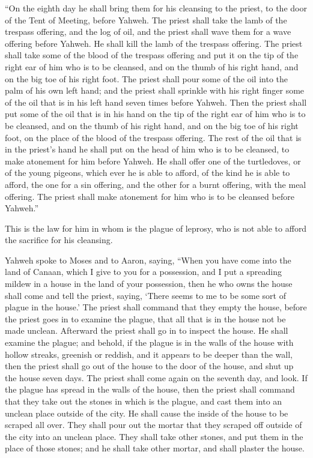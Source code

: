  ``On the eighth day he shall bring them for his cleansing
to the priest, to the door of the Tent of Meeting, before Yahweh.
 The priest shall take the lamb of the trespass offering,
and the log of oil, and the priest shall wave them for a wave offering
before Yahweh.  He shall kill the lamb of the trespass
offering. The priest shall take some of the blood of the trespass
offering and put it on the tip of the right ear of him who is to be
cleansed, and on the thumb of his right hand, and on the big toe of his
right foot.  The priest shall pour some of the oil into the
palm of his own left hand;  and the priest shall sprinkle
with his right finger some of the oil that is in his left hand seven
times before Yahweh.  Then the priest shall put some of the
oil that is in his hand on the tip of the right ear of him who is to be
cleansed, and on the thumb of his right hand, and on the big toe of his
right foot, on the place of the blood of the trespass offering.
 The rest of the oil that is in the priest's hand he shall
put on the head of him who is to be cleansed, to make atonement for him
before Yahweh.  He shall offer one of the turtledoves, or
of the young pigeons, which ever he is able to afford,  of
the kind he is able to afford, the one for a sin offering, and the other
for a burnt offering, with the meal offering. The priest shall make
atonement for him who is to be cleansed before Yahweh.''

 This is the law for him in whom is the plague of leprosy,
who is not able to afford the sacrifice for his cleansing.

 Yahweh spoke to Moses and to Aaron, saying, 
``When you have come into the land of Canaan, which I give to you for a
possession, and I put a spreading mildew in a house in the land of your
possession,  then he who owns the house shall come and tell
the priest, saying, `There seems to me to be some sort of plague in the
house.'  The priest shall command that they empty the
house, before the priest goes in to examine the plague, that all that is
in the house not be made unclean. Afterward the priest shall go in to
inspect the house.  He shall examine the plague; and
behold, if the plague is in the walls of the house with hollow streaks,
greenish or reddish, and it appears to be deeper than the wall,
 then the priest shall go out of the house to the door of
the house, and shut up the house seven days.  The priest
shall come again on the seventh day, and look. If the plague has spread
in the walls of the house,  then the priest shall command
that they take out the stones in which is the plague, and cast them into
an unclean place outside of the city.  He shall cause the
inside of the house to be scraped all over. They shall pour out the
mortar that they scraped off outside of the city into an unclean place.
 They shall take other stones, and put them in the place of
those stones; and he shall take other mortar, and shall plaster the
house.


